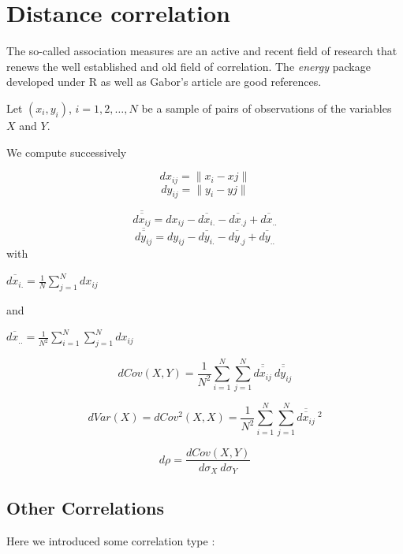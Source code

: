 \documentclass[
]{report}
\begin{document}
\hypertarget{distance-correlation}{%
\section{Distance correlation}\label{distance-correlation}}

The so-called association measures are an active and recent field of research that renews the well established and old field of correlation. The \emph{energy} package developed under R as well as Gabor's article \citep{discor} are good references.

Let \((x_i,y_i)\), \(i=1,2, \dots, N\) be a sample of pairs of observations of the variables \(X\) and \(Y\).

We compute successively

\[dx_{ij}=\lVert x_i-xj \rVert\]
\[dy_{ij}=\lVert y_i-yj \rVert\]

\[\overline{\overline{dx_{ij}}}=dx_{ij}-\overline{dx_{i.}}-\overline{dx_{.j}}+\overline{dx_{..}}\]
\[\overline{\overline{dy_{ij}}}=dy_{ij}-\overline{dy_{i.}}-\overline{dy_{.j}}+\overline{dy_{..}}\]
with

\(\overline{dx_{i.}}=\frac{1}{N}\sum_{j=1}^{N} dx_{ij}\)

and

\(\overline{dx_{..}}=\frac{1}{N^2}\sum_{i=1}^{N}\sum_{j=1}^{N} dx_{ij}\)

\[dCov(X,Y)=\frac{1}{N^2}\sum_{i=1}^{N}\sum_{j=1}^{N}
\overline{\overline{dx_{ij}}}~ 
\overline{\overline{dy_{ij}}}\]

\[dVar(X)=dCov^2(X,X)=\frac{1}{N^2}\sum_{i=1}^{N}\sum_{j=1}^{N} 
\overline{\overline{dx_{ij}}}~^2\]

\[d\rho=\frac{dCov(X,Y)}{d\sigma_X~d\sigma_Y}\]

\hypertarget{other-correlations}{%
\subsection{Other Correlations}\label{other-correlations}}

Here we introduced some correlation type \citep{mako}:
\end{document}
